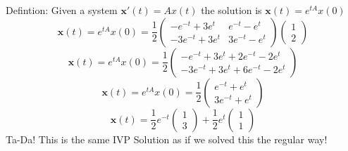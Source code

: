 \documentclass[12pt]{article}
\begin{document}
\begin{enumerate}
    Defintion: Given a system $\mathbf{x}'(t) = Ax(t)$ the solution is $\mathbf{x}(t)=e^{tA}x(0)$
    \[\mathbf{x}(t) = e^{tA}x(0) = \frac{1}{2} \begin{pmatrix} -e^{-t} + 3e^{t} & e^{-t} - e^{t} \\ -3e^{-t}+3e^{t} & 3e^{-t} - e^{t}\end{pmatrix} \begin{pmatrix} 1 \\ 2 \end{pmatrix}\]
    \[\mathbf{x}(t) = e^{tA}x(0) = \frac{1}{2} \begin{pmatrix} -e^{-t} + 3e^{t} + 2e^{-t} - 2e^{t} \\ -3e^{-t} + 3e^{t} + 6e^{-t} - 2e^{t} \end{pmatrix}\]
    \[\mathbf{x}(t) = e^{tA}x(0) = \frac{1}{2} \begin{pmatrix} e^{-t} + e^{t} \\ 3e^{-t} + e^{t} \end{pmatrix}\]
    \[\mathbf{x}(t) = \frac{1}{2}e^{-t}\begin{pmatrix} 1 \\ 3 \end{pmatrix} + \frac{1}{2} e^{t} \begin{pmatrix} 1 \\ 1 \end{pmatrix}\]
    Ta-Da! This is the same IVP Solution as if we solved this the regular way!
\end{enumerate}
\end{document}
